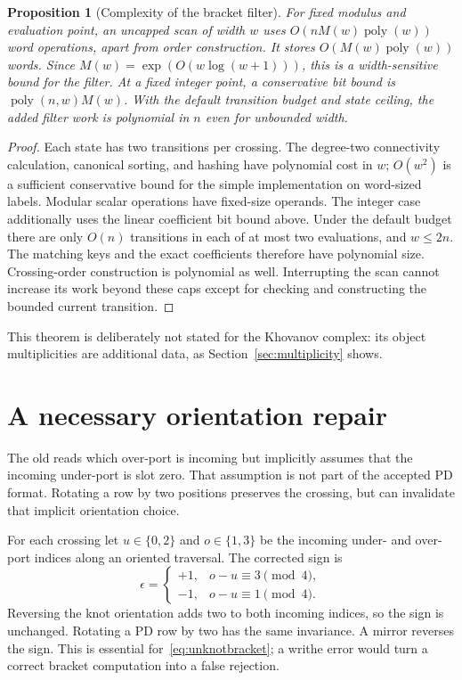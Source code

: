 \documentclass[11pt]{article}
\newtheorem{proposition}[theorem]{Proposition}
\theoremstyle{remark}\newtheorem{remark}[theorem]{Remark}
\newcommand{\code}[1]{\texttt{\detokenize{#1}}}
\begin{document}
\begin{proposition}[Complexity of the bracket filter]
For fixed modulus and evaluation point, an uncapped scan of width $w$ uses
$O(nM(w)\operatorname{poly}(w))$ word operations, apart from order construction.
It stores $O(M(w)\operatorname{poly}(w))$ words. Since
$M(w)=\exp(O(w\log(w+1)))$, this is a width-sensitive bound for the filter.
At a fixed integer point, a conservative bit bound is
$\operatorname{poly}(n,w)M(w)$. With the default transition budget and state
ceiling, the added filter work is polynomial in $n$ even for unbounded width.
\end{proposition}
\begin{proof}
Each state has two transitions per crossing. The degree-two connectivity
calculation, canonical sorting, and hashing have polynomial cost in $w$;
$O(w^2)$ is a sufficient conservative bound for the simple implementation on
word-sized labels. Modular scalar operations have fixed-size operands.
The integer case additionally uses the linear coefficient bit bound above.
Under the default budget there are only $O(n)$ transitions in each of at most
two evaluations, and $w\le2n$. The matching keys and the exact coefficients
therefore have polynomial size. Crossing-order construction is polynomial as
well. Interrupting the scan cannot increase its work beyond these caps except
for checking and constructing the bounded current transition.
\end{proof}

This theorem is deliberately not stated for the Khovanov complex: its object
multiplicities are additional data, as Section~\ref{sec:multiplicity} shows.

\section{A necessary orientation repair}
\label{sec:writhe}
The old \code{Diagram.signs()} reads which over-port is incoming but implicitly
assumes that the incoming under-port is slot zero. That assumption is not part
of the accepted PD format. Rotating a row by two positions preserves the
crossing, but can invalidate that implicit orientation choice.

For each crossing let $u\in\{0,2\}$ and $o\in\{1,3\}$ be the incoming under-
and over-port indices along an oriented traversal. The corrected sign is
\begin{equation}
 \epsilon=\begin{cases}+1,&o-u\equiv3\pmod4,\\-1,&o-u\equiv1\pmod4.
 \end{cases}
\end{equation}
Reversing the knot orientation adds two to both incoming indices, so the sign
is unchanged. Rotating a PD row by two has the same invariance. A mirror
reverses the sign. This is essential for~\eqref{eq:unknotbracket}; a writhe error
would turn a correct bracket computation into a false rejection.
\end{document}
